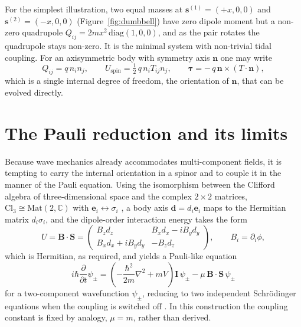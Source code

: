\documentclass[11pt,a4paper]{article}
\newcommand{\svec}{\mathbf{s}}
\newcommand{\nn}{\mathbf{n}}
\newcommand{\half}{\tfrac{1}{2}}
\begin{document}
For the simplest illustration, two equal masses at $\svec^{(1)}=(+x,0,0)$ and
$\svec^{(2)}=(-x,0,0)$ (Figure~\ref{fig:dumbbell}) have zero dipole moment but a non-zero
quadrupole $Q_{ij} = 2mx^2\,\mathrm{diag}(1,0,0)$, and as the pair rotates the
quadrupole stays non-zero. It is the minimal system with non-trivial tidal coupling.
For an axisymmetric body with symmetry axis $\nn$ one may write
%
\begin{equation}
  Q_{ij} = q\,n_i n_j, \qquad
  U_{\mathrm{spin}} = \half\,q\,n_i T_{ij} n_j, \qquad
  \boldsymbol{\tau} = -\,q\,\nn\times(T\cdot\nn),
  \label{eq:axisym}
\end{equation}
%
which is a single internal degree of freedom, the orientation of $\nn$, that can be
evolved directly.

\section{The Pauli reduction and its limits}
\label{sec:pauli}

Because wave mechanics already accommodates multi-component fields, it is tempting to
carry the internal orientation in a spinor and to couple it in the manner of the Pauli
equation. Using the isomorphism between the Clifford algebra of three-dimensional space
and the complex $2\times2$ matrices, $\mathrm{Cl}_3 \cong \mathrm{Mat}(2,\mathbb{C})$
with $\mathbf{e}_i \leftrightarrow \sigma_i$ \citep{lounesto2001}, a body axis
$\mathbf{d}=d_i\mathbf{e}_i$ maps to the Hermitian matrix $d_i\sigma_i$, and the
dipole-order interaction energy takes the form
%
\begin{equation}
  U = \mathbf{B}\cdot\mathbf{S}
  = \begin{pmatrix} B_z d_z & B_x d_x - i B_y d_y \\
                    B_x d_x + i B_y d_y & -B_z d_z \end{pmatrix},
  \qquad B_i = \partial_i\phi,
\end{equation}
%
which is Hermitian, as required, and yields a Pauli-like equation
%
\begin{equation}
  i\hbar\frac{\partial}{\partial t}\psi_{\pm}
  = \left( -\frac{\hbar^2}{2m}\nabla^2 + mV \right)\mathbf{I}\,\psi_{\pm}
  - \mu\,\mathbf{B}\cdot\mathbf{S}\,\psi_{\pm}
\end{equation}
%
for a two-component wavefunction $\psi_{\pm}$, reducing to two independent
Schr\"odinger equations when the coupling is switched off \citep{johnston2010}. In this
construction the coupling constant is fixed by analogy, $\mu = m$, rather than derived.
\end{document}
